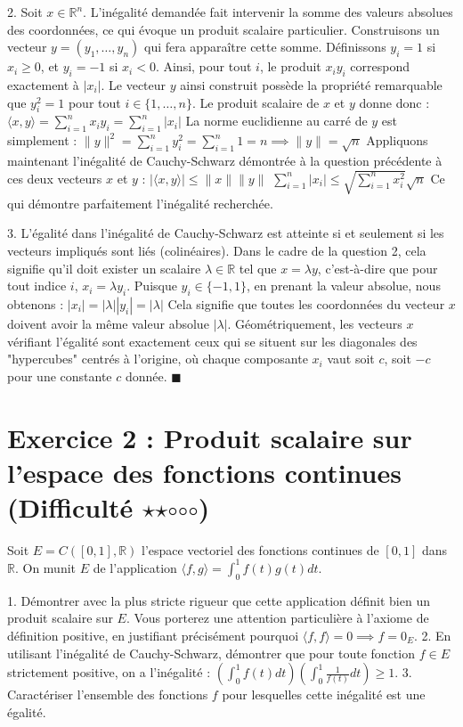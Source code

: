 \documentclass{report}
\begin{document}
2. Soit $x \in \mathbb{R}^n$. L'inégalité demandée fait intervenir la somme des valeurs absolues des coordonnées, ce qui évoque un produit scalaire particulier. Construisons un vecteur $y = (y_1, \ldots, y_n)$ qui fera apparaître cette somme. Définissons $y_i = 1$ si $x_i \ge 0$, et $y_i = -1$ si $x_i < 0$. Ainsi, pour tout $i$, le produit $x_i y_i$ correspond exactement à $|x_i|$. Le vecteur $y$ ainsi construit possède la propriété remarquable que $y_i^2 = 1$ pour tout $i \in \{1, \ldots, n\}$.
   Le produit scalaire de $x$ et $y$ donne donc :
   $ \langle x, y \rangle = \sum_{i=1}^n x_i y_i = \sum_{i=1}^n |x_i| $
   La norme euclidienne au carré de $y$ est simplement :
   $ \|y\|^2 = \sum_{i=1}^n y_i^2 = \sum_{i=1}^n 1 = n \implies \|y\| = \sqrt{n} $
   Appliquons maintenant l'inégalité de Cauchy-Schwarz démontrée à la question précédente à ces deux vecteurs $x$ et $y$ :
   $ |\langle x, y \rangle| \le \|x\| \|y\| $
   $ \sum_{i=1}^n |x_i| \le \sqrt{\sum_{i=1}^n x_i^2} \sqrt{n} $
   Ce qui démontre parfaitement l'inégalité recherchée.

3. L'égalité dans l'inégalité de Cauchy-Schwarz est atteinte si et seulement si les vecteurs impliqués sont liés (colinéaires). Dans le cadre de la question 2, cela signifie qu'il doit exister un scalaire $\lambda \in \mathbb{R}$ tel que $x = \lambda y$, c'est-à-dire que pour tout indice $i$, $x_i = \lambda y_i$.
   Puisque $y_i \in \{-1, 1\}$, en prenant la valeur absolue, nous obtenons :
   $ |x_i| = |\lambda| |y_i| = |\lambda| $
   Cela signifie que toutes les coordonnées du vecteur $x$ doivent avoir la même valeur absolue $|\lambda|$. Géométriquement, les vecteurs $x$ vérifiant l'égalité sont exactement ceux qui se situent sur les diagonales des "hypercubes" centrés à l'origine, où chaque composante $x_i$ vaut soit $c$, soit $-c$ pour une constante $c$ donnée.
   $\blacksquare$

\newpage


\chapter*{Exercice 2 : Produit scalaire sur l'espace des fonctions continues (Difficulté $\star$$\star$$\circ$$\circ$$\circ$)}

Soit $E = C([0, 1], \mathbb{R})$ l'espace vectoriel des fonctions continues de $[0, 1]$ dans $\mathbb{R}$. On munit $E$ de l'application $\langle f, g \rangle = \int_0^1 f(t)g(t)dt$.

1. Démontrer avec la plus stricte rigueur que cette application définit bien un produit scalaire sur $E$. Vous porterez une attention particulière à l'axiome de définition positive, en justifiant précisément pourquoi $\langle f, f \rangle = 0 \implies f = 0_E$.
2. En utilisant l'inégalité de Cauchy-Schwarz, démontrer que pour toute fonction $f \in E$ strictement positive, on a l'inégalité : $\left( \int_0^1 f(t) dt \right) \left( \int_0^1 \frac{1}{f(t)} dt \right) \ge 1$.
3. Caractériser l'ensemble des fonctions $f$ pour lesquelles cette inégalité est une égalité.
\end{document}
